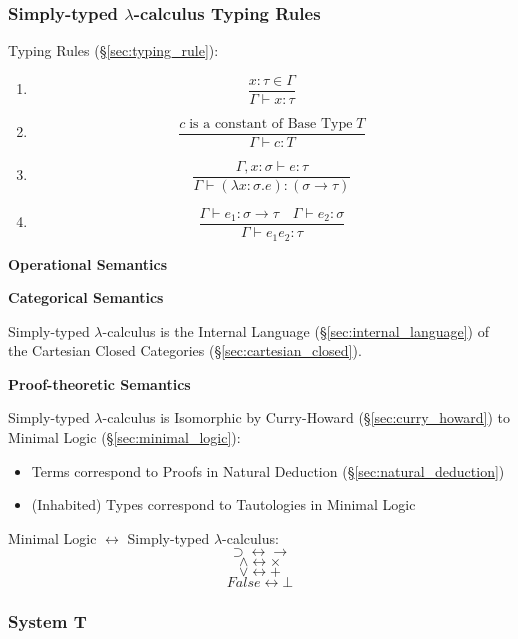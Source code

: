 \subsubsection{Simply-typed $\lambda$-calculus Typing Rules}
\label{sec:simplytyped_rules}

Typing Rules (\S\ref{sec:typing_rule}):
\begin{enumerate}
\item
  \[
    {
      \frac
      {x : \tau \in \Gamma}
      {\Gamma \vdash x : \tau}
    }
  \]
\item
  \[
    {
      \frac
      {c \;\text{is a constant of Base Type}\; T}
      {\Gamma \vdash c:T}
    }
  \]
\item
  \[
    {
      \frac
      {\Gamma, x:\sigma \vdash e:\tau}
      {\Gamma \vdash (\lambda x:\sigma.e):(\sigma \rightarrow \tau)}
    }
  \]
\item
  \[
    {
      \frac
      {\Gamma \vdash e_1:\sigma \rightarrow \tau \quad
        \Gamma \vdash e_2:\sigma}
      {\Gamma \vdash e_1 e_2 : \tau}
    }
  \]
\end{enumerate}



\textbf{Operational Semantics}

\textbf{Categorical Semantics}

Simply-typed $\lambda$-calculus is the Internal Language
(\S\ref{sec:internal_language}) of the Cartesian Closed Categories
(\S\ref{sec:cartesian_closed}).



\textbf{Proof-theoretic Semantics}

Simply-typed $\lambda$-calculus is Isomorphic by Curry-Howard
(\S\ref{sec:curry_howard}) to Minimal Logic
(\S\ref{sec:minimal_logic}):
\begin{itemize}
  \item Terms correspond to Proofs in Natural Deduction
    (\S\ref{sec:natural_deduction})
  \item (Inhabited) Types correspond to Tautologies in Minimal Logic
\end{itemize}



Minimal Logic $\leftrightarrow$ Simply-typed $\lambda$-calculus:
\[
  \supset \leftrightarrow \rightarrow
\] \[
  \wedge \leftrightarrow \times
\] \[
  \vee \leftrightarrow +
\] \[
  False \leftrightarrow \bot
\]



\subsubsection{System T}\label{sec:system_t}

